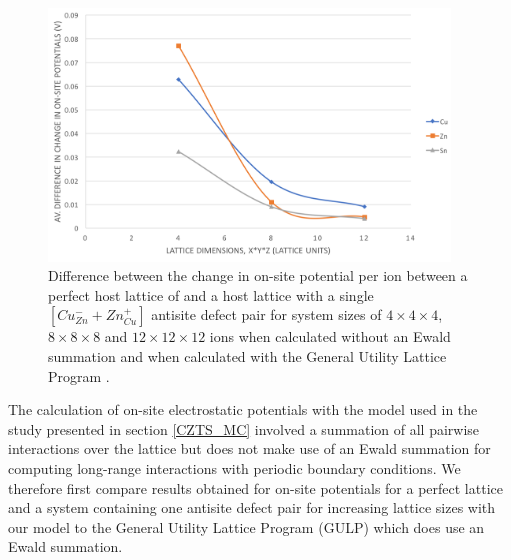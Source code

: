 \documentclass[11pt, twoside]{report}
\begin{document}
\begin{figure}[h!]
  \centering
    \includegraphics[width=0.95\textwidth]{figures/eris_vs_gulp.png}
    \caption[Difference between the change in on-site potential per ion between a perfect host lattice of {\CZTS} and a host lattice with a single antisite defect pair for system sizes of $4\times4\times4$, $8\times8\times8$ and $12\times12\times12$ ions when calculated without an Ewald summation and when calculated with the General Utility Lattice Program.]{Difference between the change in on-site potential per ion between a perfect host lattice of {\CZTS} and a host lattice with a single $[Cu_{Zn}^{-} + Zn_{Cu}^{+}]$ antisite defect pair for system sizes of $4\times4\times4$, $8\times8\times8$ and $12\times12\times12$ ions when calculated without an Ewald summation and when calculated with the General Utility Lattice Program \cite{gulp}.}
  \label{eris_vs_gulp}
\end{figure}

The calculation of on-site electrostatic potentials with the model used in the study presented in section \ref{CZTS_MC} involved a summation of all pairwise interactions over the lattice but does not make use of an Ewald summation for computing long-range interactions with periodic boundary conditions. We therefore first compare results obtained for on-site potentials for a perfect lattice and a system containing one antisite defect pair for increasing lattice sizes with our model to the General Utility Lattice Program (GULP) \cite{gulp} which does use an Ewald summation.
\end{document}
